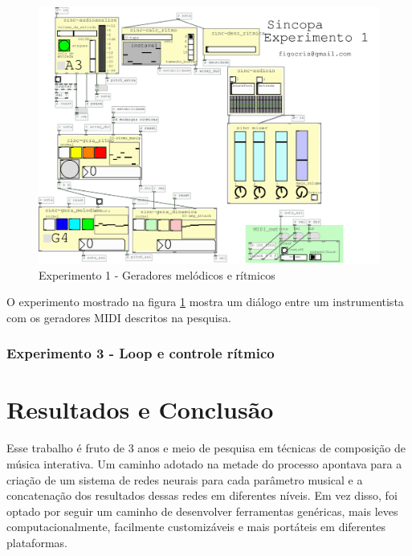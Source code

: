 \documentclass[draft]{ppgmus}
\begin{document}
\begin{figure}
\includegraphics[scale=.4]{experimento1}
\caption{Experimento 1 - Geradores melódicos e rítmicos}
\label{experimento1}
\end{figure}


O experimento mostrado na figura \ref{experimento1} mostra um diálogo
entre um instrumentista com os geradores MIDI descritos na pesquisa.




\subsection{Experimento 3 - Loop e controle rítmico}










\chapter{Resultados e Conclusão}
\label{sec:conclusao}


Esse trabalho é fruto de 3 anos e meio de pesquisa em técnicas
de composição de música interativa. Um caminho adotado na metade do
processo apontava para a criação de um sistema de redes neurais 
para cada parâmetro musical e a concatenação dos resultados dessas redes
em diferentes níveis. Em vez disso, foi optado por seguir um caminho
de desenvolver ferramentas genéricas, mais leves computacionalmente,
facilmente customizáveis e mais portáteis em diferentes plataformas.
\end{document}
